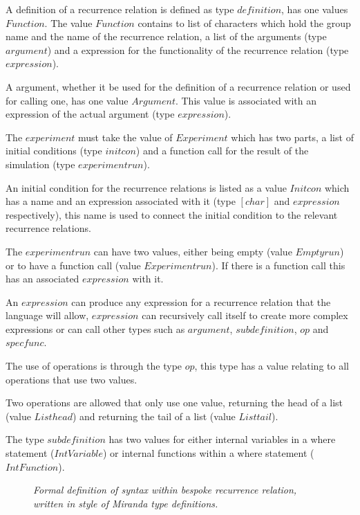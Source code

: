 \documentclass{article}
\begin{document}
A definition of a recurrence relation is defined as type $definition$, has one values $Function$. The value $Function$ contains to list of characters which hold the group name and the name of the recurrence relation, a list of the arguments (type $argument$) and a expression for the functionality of the recurrence relation (type $expression$). 

A argument, whether it be used for the definition of a recurrence relation or used for calling one, has one value $Argument$. This value is associated with an expression of the actual argument (type $expression$). 

The $experiment$ must take the value of $Experiment$ which has two parts, a list of initial conditions (type $initcon$) and a function call for the result of the simulation (type $experimentrun$). 

An initial condition for the recurrence relations is listed as a value $Initcon$ which has a name and an expression associated with it (type $[char]$ and $expression$ respectively), this name is used to connect the initial condition to the relevant recurrence relations. 

The $experimentrun$ can have two values, either being empty (value $Emptyrun$) or to have a function call (value $Experimentrun$). If there is a function call this has an associated $expression$ with it. 

An $expression$ can produce any expression for a recurrence relation that the language will allow, $expression$ can recursively call itself to create more complex expressions or  can call other types such as $argument$, $subdefinition$, $op$ and $specfunc$.    

The use of operations is through the type $op$, this type has a value relating to all operations that use two values.

Two operations are allowed that only use one value, returning the head of a list (value $Listhead$) and returning the tail of a list (value $Listtail$). 

The type $subdefinition$ has two values for either internal variables in a where statement ($IntVariable$) or internal functions within a where statement ($IntFunction$).  

\begin{figure}[H]
	\centering
	
	\caption{\it Formal definition of syntax within bespoke recurrence relation, written in style of Miranda type definitions.}
	\label{fig:parsetreecode}
\end{figure} 
\end{document}
